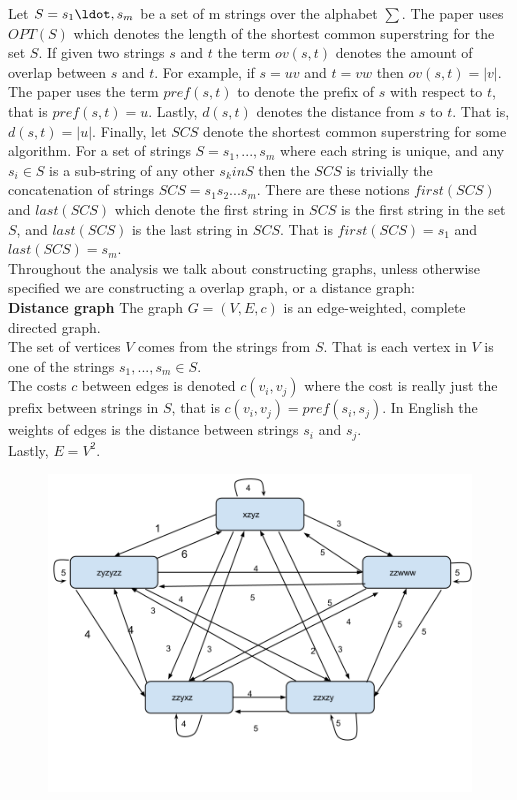 \documentclass[letterpaper,11pt,titlepage]{article}
\begin{document}
Let $S = {s_1 \ldot, s_m}$ be a set of m strings over the alphabet $\sum$. The paper uses $OPT(S)$ which denotes the length of the shortest common superstring for the set $S$. If given two strings $s$ and $t$ the term $ov(s,t)$ denotes the amount of overlap between $s$ and $t$. For example, if $s = uv$ and $t = vw$ then $ov(s,t) = |v|$. The paper uses the term $pref(s,t)$ to denote the prefix of $s$ with respect to $t$, that is $pref(s,t) = u$. Lastly, $d(s,t)$ denotes the distance from $s$ to $t$. That is, $d(s,t) = |u|$. Finally, let $SCS$ denote the shortest common superstring for some algorithm. For a set of strings $S = {s_1, ..., s_m}$ where each string is unique, and any $s_i \in S$ is a sub-string of any other $s_k in S$ then the $SCS$ is trivially the concatenation of strings $SCS = s_1s_2...s_m$. There are these notions $first(SCS)$ and $last(SCS)$ which denote the first string in $SCS$ is the first string in the set $S$, and $last(SCS)$ is the last string in $SCS$. That is $first(SCS) = s_1$ and $last(SCS) = s_m$. \\

Throughout the analysis we talk about constructing graphs, unless otherwise specified we are constructing a overlap graph, or a distance graph:\\

\textbf{Distance graph}
The graph $G = (V,E,c)$ is an edge-weighted, complete directed graph. \\
The set of vertices $V$ comes from the strings from $S$. That is each vertex in $V$ is one of the strings $s_1, ..., s_m \in S$.\\
The costs $c$ between edges is denoted $c(v_i,v_j)$ where the cost is really just the prefix between strings in $S$, that is $c(v_i,v_j) = pref(s_i,s_j)$. In English the weights of edges is the distance between strings $s_i$ and $s_j$.\\
Lastly, $E=V^2$.\\

\begin{figure}[h]
 \centering
   \includegraphics[width=.4\textwidth]{distance.png}
\end{figure}
\end{document}
